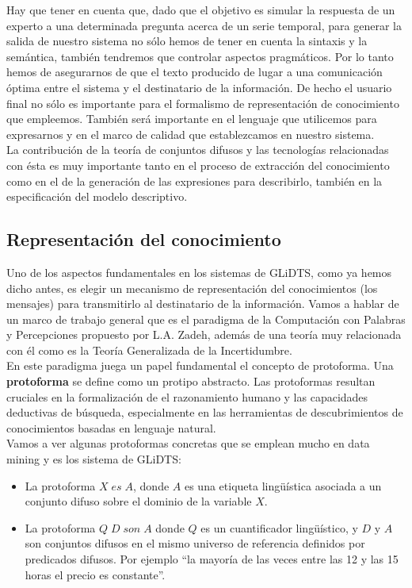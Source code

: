 \documentclass[10pt,a4paper]{article}
\begin{document}
Hay que tener en cuenta que, dado que el objetivo es simular la respuesta de un experto a una determinada pregunta acerca de un serie temporal, para generar la salida de nuestro sistema no sólo hemos de tener en cuenta la sintaxis y la semántica, también tendremos que controlar aspectos pragmáticos. Por lo tanto hemos de asegurarnos de que el texto producido de lugar a una comunicación óptima entre el sistema y el destinatario de la información. De hecho el usuario final no sólo es importante para el formalismo de representación de conocimiento que empleemos. También será importante en el lenguaje que utilicemos para expresarnos y en el marco de calidad que establezcamos en nuestro sistema.\\

La contribución de la teoría de conjuntos difusos y las tecnologías relacionadas con ésta es muy importante tanto en el proceso de extracción del conocimiento como en el de la generación de las expresiones para describirlo, también en la especificación del modelo descriptivo.

\subsection{Representación del conocimiento}

Uno de los aspectos fundamentales en los sistemas de GLiDTS, como ya hemos dicho antes, es elegir un mecanismo de representación del conocimientos (los mensajes) para transmitirlo al destinatario de la información. Vamos a hablar de un marco de trabajo general que es el paradigma de la Computación con Palabras y Percepciones propuesto por L.A. Zadeh, además de una teoría muy relacionada con él como es la Teoría Generalizada de la Incertidumbre.\\

En este paradigma juega un papel fundamental el concepto de protoforma. Una \textbf{protoforma} se define como un protipo abstracto. Las protoformas resultan cruciales en la formalización de el razonamiento humano y las capacidades deductivas de búsqueda, especialmente en las herramientas de descubrimientos de conocimientos basadas en lenguaje natural.\\

Vamos a ver algunas protoformas concretas que se emplean mucho en data mining y es los sistema de GLiDTS:

\begin{itemize}
\item La protoforma $X \; es \; A$, donde $A$ es una etiqueta lingüística asociada a un conjunto difuso sobre el dominio de la variable $X$.
\item La protoforma $Q \; D \; son \; A$ donde $Q$ es un cuantificador lingüístico, y $D$ y $A$ son conjuntos difusos en el mismo universo de referencia definidos por predicados difusos. Por ejemplo ``la mayoría de las veces entre las 12 y las 15 horas el precio es constante''.
\end{itemize}
\end{document}
